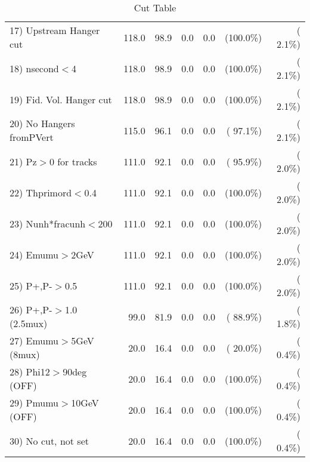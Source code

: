 \begin{table}[h!]
\begin{tabular}{||l||r|r|r|r|r|r||}
 17) Upstream Hanger cut  &        118.0 &         98.9 &          0.0 &          0.0 & (100.0\%) & (  2.1\%) \\
 18) nsecond$<$4          &        118.0 &         98.9 &          0.0 &          0.0 & (100.0\%) & (  2.1\%) \\
 19) Fid. Vol. Hanger cut &        118.0 &         98.9 &          0.0 &          0.0 & (100.0\%) & (  2.1\%) \\
 20) No Hangers fromPVert &        115.0 &         96.1 &          0.0 &          0.0 & ( 97.1\%) & (  2.1\%) \\
 21) Pz$>$0 for tracks    &        111.0 &         92.1 &          0.0 &          0.0 & ( 95.9\%) & (  2.0\%) \\
 22) Thprimord$<$0.4      &        111.0 &         92.1 &          0.0 &          0.0 & (100.0\%) & (  2.0\%) \\
 23) Nunh*fracunh$<$200   &        111.0 &         92.1 &          0.0 &          0.0 & (100.0\%) & (  2.0\%) \\
 24) Emumu$>$2GeV         &        111.0 &         92.1 &          0.0 &          0.0 & (100.0\%) & (  2.0\%) \\
 25) P+,P-$>$0.5          &        111.0 &         92.1 &          0.0 &          0.0 & (100.0\%) & (  2.0\%) \\
 26) P+,P-$>$1.0 (2.5mux) &         99.0 &         81.9 &          0.0 &          0.0 & ( 88.9\%) & (  1.8\%) \\
 27) Emumu$>$5GeV  (8mux) &         20.0 &         16.4 &          0.0 &          0.0 & ( 20.0\%) & (  0.4\%) \\
 28) Phi12$>$90deg  (OFF) &         20.0 &         16.4 &          0.0 &          0.0 & (100.0\%) & (  0.4\%) \\
 29) Pmumu$>$10GeV  (OFF) &         20.0 &         16.4 &          0.0 &          0.0 & (100.0\%) & (  0.4\%) \\
 30) No cut, not set      &         20.0 &         16.4 &          0.0 &          0.0 & (100.0\%) & (  0.4\%) \\
 \hline
 \hline
 \end{tabular}
 \caption{Cut Table           }
 \label{tab-cutcohjpsi-mumu_jpsi}
 \end{table}
